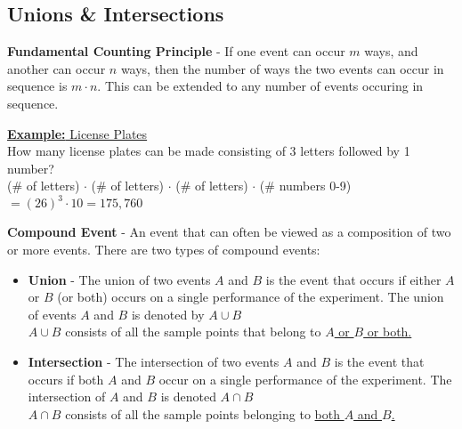 \documentclass[a4paper]{article}
\let\bf\textbf
\begin{document}
\newpage
\subsection{Unions \& Intersections}
\bf{Fundamental Counting Principle} - If one event can occur $m$ ways, and another can occur $n$ ways, then the number of ways the two events can occur in sequence is $m \cdot n$. This can be extended to any number of events occuring in sequence.
\begin{shaded}
    \underline{\bf{Example:} License Plates}
    \vspace{2mm}\\
    How many license plates can be made consisting of 3 letters followed by 1 number?\\
    (\# of letters) $\cdot$ (\# of letters) $\cdot$ (\# of letters) $\cdot$ (\# numbers 0-9) $= (26)^3 \cdot 10 = 175,760$
\end{shaded}
\noindent\bf{Compound Event} - An event that can often be viewed as a composition of two or more events. There are two types of compound events:
\begin{itemize}
    \item \bf{Union} - The union of two events $A$ and $B$ is the event that occurs if either $A$ or $B$ (or both) occurs on a single performance of the experiment. The union of events $A$ and $B$ is denoted by $A \cup B$\\ $A \cup B$ consists of all the sample points that belong to \underline{$A$ or $B$ or both.}
    \item \bf{Intersection} - The intersection of two events $A$ and $B$ is the event that occurs if both $A$ and $B$ occur on a single performance of the experiment. The intersection of $A$ and $B$ is denoted $A \cap B$\\ $A \cap B$ consists of all the sample points belonging to \underline{both $A$ and $B$.}
\end{itemize}
\end{document}

